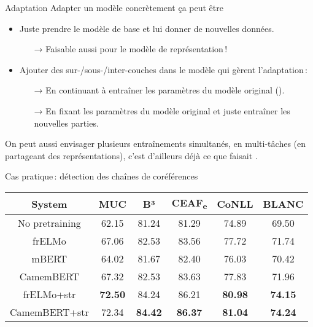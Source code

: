 \documentclass[
	xcolor={svgnames},
	aspectratio=169,
	french,
]{beamer}
\begin{document}
\begin{frame}{Adaptation}
	\alert{Adapter} un modèle concrètement ça peut être

	\pause

	\begin{itemize}[<+->]
		\item Juste prendre le modèle de base et lui donner de nouvelles données.
			\begin{itemize}
				\item[→] Faisable aussi pour le modèle de représentation !
			\end{itemize}
		\item Ajouter des sur-/sous-/inter-couches dans le modèle qui gèrent l'adaptation :
			\begin{itemize}
				\item[→] En continuant à entraîner les paramètres du modèle original ().
				\item[→] En fixant les paramètres du modèle original et juste entraîner les nouvelles parties.
			\end{itemize}
	\end{itemize}

	\pause

	On peut aussi envisager plusieurs entraînements simultanés, en \alert{multi-tâches} (en partageant des représentations), c'est d'ailleurs déjà ce que faisait \textcite{bengio2006NeuralProbabilisticLanguage}.
\end{frame}

\begin{frame}{Cas pratique : détection des chaînes de coréférences}
	\begin{center}
		\begin{tabular}{c*{5}{S}}
			\toprule
			{\textbf{System}}	& {\textbf{MUC}}	& {\textbf{B³}}	& {\textbf{CEAF\textsubscript{e}}}	& {\textbf{CoNLL}}	& {\textbf{BLANC}}\\
			\midrule
			No pretraining & 62.15 & 81.24 & 81.29 & 74.89 & 69.50\\
			frELMo & 67.06 & 82.53 & 83.56 & 77.72 & 71.74\\
			mBERT & 64.02 & 81.67 & 82.40 & 76.03 & 70.42\\
			CamemBERT & 67.32 & 82.53 & 83.63 & 77.83 & 71.96\\
			frELMo+str & \textbf{72.50} & 84.24 & 86.21 & \textbf{80.98} & \textbf{74.15}\\  %
			CamemBERT+str & 72.34 & \textbf{84.42} & \textbf{86.37} & \textbf{81.04} & \textbf{74.24}\\  %
			\bottomrule
		\end{tabular}
	\end{center}
\end{frame}
\end{document}
